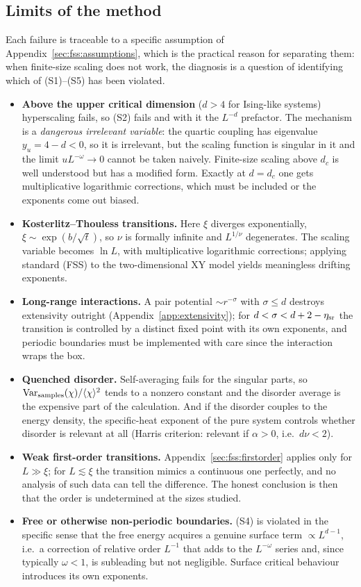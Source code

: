 \documentclass[10pt,a4paper]{article}
\theoremstyle{remark}
\newcommand{\Var}{\operatorname{Var}}
\begin{document}
\subsection{Limits of the method}
\label{sec:fss:failures}

Each failure is traceable to a specific assumption of
Appendix~\ref{sec:fss:assumptions}, which is the practical reason for separating
them: when finite-size scaling does not work, the diagnosis is a question of
identifying which of (S1)--(S5) has been violated.

\begin{itemize}
\item \textbf{Above the upper critical dimension} ($d>4$ for Ising-like systems)
hyperscaling fails, so (S2) fails and with it the $L^{-d}$ prefactor. The
mechanism is a \emph{dangerous irrelevant variable}: the quartic coupling has
eigenvalue $y_u=4-d<0$, so it is irrelevant, but the scaling function is singular
in it and the limit $uL^{-\omega}\to0$ cannot be taken naively. Finite-size
scaling above $d_c$ is well understood but has a modified form. Exactly at
$d=d_c$ one gets multiplicative logarithmic corrections, which must be included
or the exponents come out biased.
\item \textbf{Kosterlitz--Thouless transitions.} Here $\xi$ diverges
exponentially, $\xi\sim\exp(b/\sqrt{t})$, so $\nu$ is formally infinite and
$L^{1/\nu}$ degenerates. The scaling variable becomes $\ln L$, with
multiplicative logarithmic corrections; applying standard (FSS) to the
two-dimensional XY model yields meaningless drifting exponents.
\item \textbf{Long-range interactions.} A pair potential $\sim r^{-\sigma}$ with
$\sigma\leq d$ destroys extensivity outright
(Appendix~\ref{app:extensivity}); for $d<\sigma<d+2-\eta_{\rm sr}$ the transition
is controlled by a distinct fixed point with its own exponents, and periodic
boundaries must be implemented with care since the interaction wraps the box.
\item \textbf{Quenched disorder.} Self-averaging fails for the singular parts, so
$\Var_{\rm samples}(\chi)/\langle\chi\rangle^{2}$ tends to a nonzero constant and
the disorder average is the expensive part of the calculation. And if the
disorder couples to the energy density, the specific-heat exponent of the pure
system controls whether disorder is relevant at all (Harris criterion: relevant
if $\alpha>0$, i.e.\ $d\nu<2$).
\item \textbf{Weak first-order transitions.} Appendix~\ref{sec:fss:firstorder}
applies only for $L\gg\xi$; for $L\lesssim\xi$ the transition mimics a continuous
one perfectly, and no analysis of such data can tell the difference. The honest
conclusion is then that the order is undetermined at the sizes studied.
\item \textbf{Free or otherwise non-periodic boundaries.} (S4) is violated in the
specific sense that the free energy acquires a genuine surface term $\propto
L^{d-1}$, i.e.\ a correction of relative order $L^{-1}$ that adds to the
$L^{-\omega}$ series and, since typically $\omega<1$, is subleading but not
negligible. Surface critical behaviour introduces its own exponents.
\end{itemize}
\end{document}

